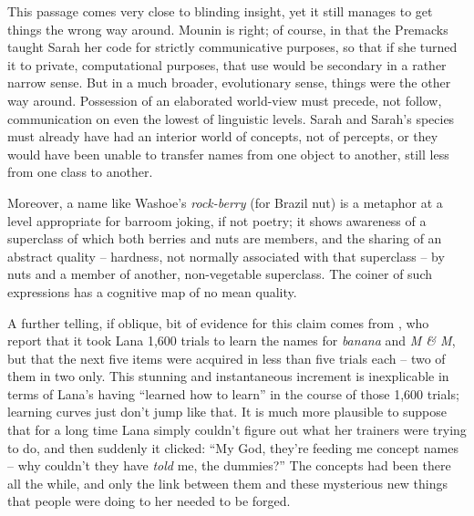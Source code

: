 This passage comes very close to blinding insight, yet it still manages to get things the wrong way around. Mounin is right; of course, in that the Premacks taught Sarah her code for strictly communicative purposes, so that if she turned it to private, computational purposes, that use would be secondary in a rather narrow sense. But in a much broader, evolutionary sense, things were the other way around. Possession of an elaborated world-view must precede, not follow, communication on even the lowest of linguistic levels. Sarah and Sarah's species must already have had an interior world of concepts, not of percepts, or they would have been unable to transfer names from one object to another, still less from one class to another.

Moreover, a name like Washoe's \textit{rock-berry} (for Brazil nut) is a metaphor at a level appropriate for barroom joking, if not poetry; it shows awareness of a superclass of which both berries and nuts are members, and the sharing of an abstract quality -- hardness, not normally associated with that superclass -- by nuts and a member of another, non-vegetable superclass. The coiner of such expressions has a cognitive map of no mean quality.

A further telling, if oblique, bit of evidence for this claim comes from \citet{RumbaughEtAl1976}, who report that it took Lana 1,600 trials to learn the names for \textit{banana} and \textit{M \& M}, but that the next five items were acquired in less than five trials each -- two of them in two only. This stunning and instantaneous increment is inexplicable in terms of Lana's having ``learned how to learn'' in the course of those 1,600 trials; learning curves just don't jump like that. It is much more plausible to suppose that for a long time Lana simply couldn't figure out what her trainers were trying to do, and then suddenly it clicked: ``My God, they're feeding me concept names -- why couldn't they have \textit{told} me, the dummies?'' The concepts had been there all the while, and only the link between them and these mysterious new things that people were doing to her needed to be forged.


